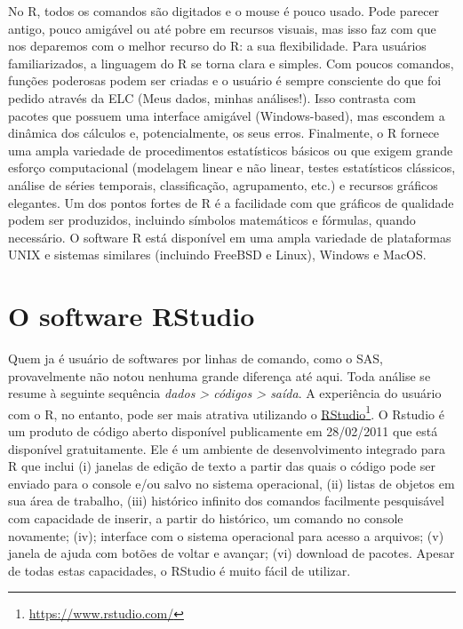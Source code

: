 \documentclass[]{book}
\let\rmarkdownfootnote\footnote%
\def\footnote{\protect\rmarkdownfootnote}
\newcommand{\indt}[1]{\index{#1|ST}}
\begin{document}
No \indt{software} R, todos os comandos são digitados e o mouse é pouco usado. Pode parecer antigo, pouco amigável ou até pobre em recursos visuais, mas isso faz com que nos deparemos com o melhor recurso do R: a sua flexibilidade. Para usuários familiarizados, a linguagem do R se torna clara e simples. Com poucos comandos, funções poderosas podem ser criadas e o usuário é sempre consciente do que foi pedido através da ELC (Meus dados, minhas análises!). Isso contrasta com pacotes que possuem uma interface amigável (Windows-based), mas escondem a dinâmica dos cálculos e, potencialmente, os seus erros. Finalmente, o R fornece uma ampla variedade de procedimentos estatísticos básicos ou que exigem grande esforço computacional (modelagem linear e não linear, testes estatísticos clássicos, análise de séries temporais, classificação, agrupamento, etc.) e recursos gráficos elegantes. Um dos pontos fortes de R é a facilidade com que gráficos de qualidade podem ser produzidos, incluindo símbolos matemáticos e fórmulas, quando necessário. O software R está disponível em uma ampla variedade de plataformas UNIX e sistemas similares (incluindo FreeBSD e Linux), Windows e MacOS.

\hypertarget{o-software-rstudio}{%
\section{O software RStudio}\label{o-software-rstudio}}

Quem ja é usuário de softwares por linhas de comando, como o SAS, provavelmente não notou nenhuma grande diferença até aqui. Toda análise se resume à seguinte sequência \emph{dados \textgreater{} códigos \textgreater{} saída}. A experiência do usuário com o R, no entanto, pode ser mais atrativa utilizando o \href{https://www.rstudio.com/}{RStudio}\footnote{\url{https://www.rstudio.com/}}. O Rstudio é um produto de código aberto disponível publicamente em 28/02/2011 que está disponível gratuitamente. Ele é um ambiente de desenvolvimento integrado para R que inclui (i) janelas de edição de texto a partir das quais o código pode ser enviado para o console e/ou salvo no sistema operacional, (ii) listas de objetos em sua área de trabalho, (iii) histórico infinito dos comandos facilmente pesquisável com capacidade de inserir, a partir do histórico, um comando no console novamente; (iv); interface com o sistema operacional para acesso a arquivos; (v) janela de ajuda com botões de voltar e avançar; (vi) download de pacotes. Apesar de todas estas capacidades, o RStudio é muito fácil de utilizar.
\end{document}
